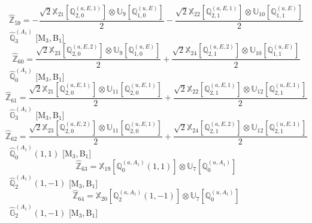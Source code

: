 \documentclass[fleqn,10pt,landscape]{article}
\begin{document}
\begin{itemize}
\begin{dmath*}
\hat{\mathbb{Z}}_{59}=- \frac{\sqrt{2} \mathbb{X}_{21}[\mathbb{Q}_{2,0}^{(a,E,1)}] \otimes\mathbb{U}_{9}[\mathbb{Q}_{1,0}^{(u,E)}]}{2} - \frac{\sqrt{2} \mathbb{X}_{22}[\mathbb{Q}_{2,1}^{(a,E,1)}] \otimes\mathbb{U}_{10}[\mathbb{Q}_{1,1}^{(u,E)}]}{2}
\end{dmath*}
\vspace{4mm}
\noindent {} $\,\,\,\hat{\mathbb{Q}}_{3}^{(A_{1})}$ [M$_{3}$,\,B$_{1}$]
\begin{dmath*}
\hat{\mathbb{Z}}_{60}=\frac{\sqrt{2} \mathbb{X}_{23}[\mathbb{Q}_{2,0}^{(a,E,2)}] \otimes\mathbb{U}_{9}[\mathbb{Q}_{1,0}^{(u,E)}]}{2} + \frac{\sqrt{2} \mathbb{X}_{24}[\mathbb{Q}_{2,1}^{(a,E,2)}] \otimes\mathbb{U}_{10}[\mathbb{Q}_{1,1}^{(u,E)}]}{2}
\end{dmath*}
\vspace{4mm}
\noindent {} $\,\,\,\hat{\mathbb{Q}}_{0}^{(A_{1})}$ [M$_{3}$,\,B$_{1}$]
\begin{dmath*}
\hat{\mathbb{Z}}_{61}=\frac{\sqrt{2} \mathbb{X}_{21}[\mathbb{Q}_{2,0}^{(a,E,1)}] \otimes\mathbb{U}_{11}[\mathbb{Q}_{2,0}^{(u,E,1)}]}{2} + \frac{\sqrt{2} \mathbb{X}_{22}[\mathbb{Q}_{2,1}^{(a,E,1)}] \otimes\mathbb{U}_{12}[\mathbb{Q}_{2,1}^{(u,E,1)}]}{2}
\end{dmath*}
\vspace{4mm}
\noindent {} $\,\,\,\hat{\mathbb{G}}_{3}^{(A_{1})}$ [M$_{3}$,\,B$_{1}$]
\begin{dmath*}
\hat{\mathbb{Z}}_{62}=\frac{\sqrt{2} \mathbb{X}_{23}[\mathbb{Q}_{2,0}^{(a,E,2)}] \otimes\mathbb{U}_{11}[\mathbb{Q}_{2,0}^{(u,E,1)}]}{2} + \frac{\sqrt{2} \mathbb{X}_{24}[\mathbb{Q}_{2,1}^{(a,E,2)}] \otimes\mathbb{U}_{12}[\mathbb{Q}_{2,1}^{(u,E,1)}]}{2}
\end{dmath*}
\vspace{4mm}
\noindent {} $\,\,\,\hat{\mathbb{Q}}_{0}^{(A_{1})}(1,1)$ [M$_{3}$,\,B$_{1}$]
\begin{dmath*}
\hat{\mathbb{Z}}_{63}=\mathbb{X}_{19}[\mathbb{Q}_{0}^{(a,A_{1})}(1,1)] \otimes\mathbb{U}_{7}[\mathbb{Q}_{0}^{(u,A_{1})}]
\end{dmath*}
\vspace{4mm}
\noindent {} $\,\,\,\hat{\mathbb{Q}}_{2}^{(A_{1})}(1,-1)$ [M$_{3}$,\,B$_{1}$]
\begin{dmath*}
\hat{\mathbb{Z}}_{64}=\mathbb{X}_{20}[\mathbb{Q}_{2}^{(a,A_{1})}(1,-1)] \otimes\mathbb{U}_{7}[\mathbb{Q}_{0}^{(u,A_{1})}]
\end{dmath*}
\vspace{4mm}
\noindent {} $\,\,\,\hat{\mathbb{G}}_{2}^{(A_{1})}(1,-1)$ [M$_{3}$,\,B$_{1}$]

\end{itemize}
\end{document}
